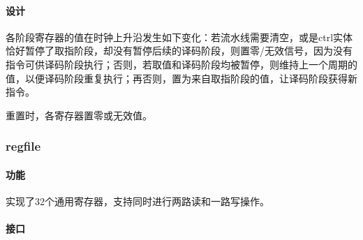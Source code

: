 \documentclass{article}
\begin{document}
\begin{spacing}{1.4}
\paragraph{设计}\mbox{}

各阶段寄存器的值在时钟上升沿发生如下变化：若流水线需要清空，或是ctrl实体恰好暂停了取指阶段，却没有暂停后续的译码阶段，则置零/无效信号，因为没有指令可供译码阶段执行；否则，若取值和译码阶段均被暂停，则维持上一个周期的值，以便译码阶段重复执行；再否则，置为来自取指阶段的值，让译码阶段获得新指令。

重置时，各寄存器置零或无效值。

\subsubsection{regfile}

\paragraph{功能}\mbox{}

实现了32个通用寄存器，支持同时进行两路读和一路写操作。

\paragraph{接口}\mbox{}


\end{spacing}
\end{document}
